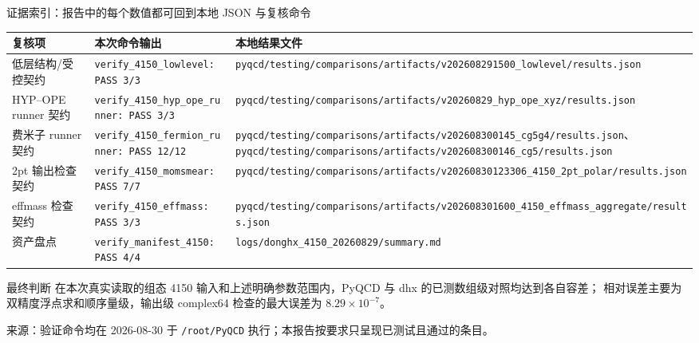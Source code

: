 \documentclass[UTF8,aspectratio=169,11pt]{ctexbeamer}
\newcommand{\source}[1]{\vspace{0.05em}\par{\raggedright\scriptsize\color{muted}来源：#1\par}}
\newcommand{\codepath}[1]{\nolinkurl{#1}}
\begin{document}
\begin{frame}[t]{证据索引：报告中的每个数值都可回到本地 JSON 与复核命令}
  \scriptsize
  \setlength{\tabcolsep}{3pt}
  \begin{tabularx}{0.96\textwidth}{@{}P{0.24\textwidth} P{0.31\textwidth} Y@{}}
    \toprule
    复核项 & 本次命令输出 & 本地结果文件 \\
    \midrule
   低层结构/受控契约 & \texttt{verify\_4150\_lowlevel: PASS 3/3} & \codepath{pyqcd/testing/comparisons/artifacts/v202608291500_lowlevel/results.json} \\
    HYP--OPE runner 契约 & \texttt{verify\_4150\_hyp\_ope\_runner: PASS 3/3} & \codepath{pyqcd/testing/comparisons/artifacts/v20260829_hyp_ope_xyz/results.json} \\
    费米子 runner 契约 & \texttt{verify\_4150\_fermion\_runner: PASS 12/12} & \codepath{pyqcd/testing/comparisons/artifacts/v202608300145_cg5g4/results.json}、\codepath{pyqcd/testing/comparisons/artifacts/v202608300146_cg5/results.json} \\
    2pt 输出检查契约 & \texttt{verify\_4150\_momsmear: PASS 7/7} & \codepath{pyqcd/testing/comparisons/artifacts/v20260830123306_4150_2pt_polar/results.json} \\
    effmass 检查契约 & \texttt{verify\_4150\_effmass: PASS 3/3} & \codepath{pyqcd/testing/comparisons/artifacts/v202608301600_4150_effmass_aggregate/results.json} \\
    资产盘点 & \texttt{verify\_manifest\_4150: PASS 4/4} & \codepath{logs/donghx_4150_20260829/summary.md} \\
    \bottomrule
  \end{tabularx}
  \vspace{0.18em}
  \begin{block}{最终判断}
    在本次真实读取的组态 4150 输入和上述明确参数范围内，PyQCD 与 dhx 的已测数组级对照均达到各自容差；
    相对误差主要为双精度浮点求和顺序量级，输出级 complex64 检查的最大误差为 $8.29\times10^{-7}$。
  \end{block}
  \source{验证命令均在 2026-08-30 于 \codepath{/root/PyQCD} 执行；本报告按要求只呈现已测试且通过的条目。}
\end{frame}
\end{document}
